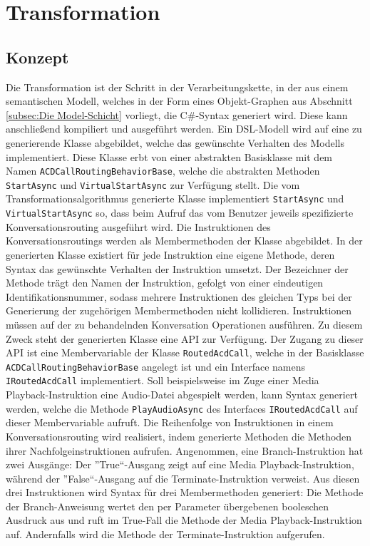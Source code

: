 \section{Transformation}
\label{sec:Transformation}

\subsection{Konzept}
\label{subsec:Konzept}
Die Transformation ist der Schritt in der Verarbeitungskette, in der aus einem semantischen Modell, welches in der Form eines Objekt-Graphen aus Abschnitt \ref{subsec:Die Model-Schicht} vorliegt, die C\#-Syntax generiert wird. Diese kann anschließend kompiliert und ausgeführt werden. Ein DSL-Modell wird auf eine zu generierende Klasse abgebildet, welche das gewünschte Verhalten des Modells implementiert. Diese Klasse erbt von einer abstrakten Basisklasse mit dem Namen \texttt{ACDCallRoutingBehaviorBase}, welche die abstrakten Methoden \texttt{StartAsync} und \texttt{VirtualStartAsync} zur Verfügung stellt. Die vom Transformationsalgorithmus generierte Klasse implementiert \texttt{Start\-Async} und \texttt{VirtualStartAsync} so, dass beim Aufruf das vom Benutzer jeweils spezifizierte Konversationsrouting ausgeführt wird.
\newline 
Die Instruktionen des Konversationsroutings werden als Membermethoden der Klasse abgebildet. In der generierten Klasse existiert für jede Instruktion eine eigene Methode, deren Syntax das gewünschte Verhalten der Instruktion umsetzt. Der Bezeichner der Methode trägt den Namen der Instruktion, gefolgt von einer eindeutigen Identifikationsnummer, sodass mehrere Instruktionen des gleichen Typs bei der Generierung der zugehörigen Membermethoden nicht kollidieren.
\newline 
Instruktionen müssen auf der zu behandelnden Konversation Operationen ausführen. Zu diesem Zweck steht der generierten Klasse eine API zur Verfügung. Der Zugang zu  dieser API ist eine Membervariable der Klasse \texttt{RoutedAcdCall}, welche in der Basisklasse \texttt{ACDCallRoutingBehaviorBase} angelegt ist und ein Interface namens \texttt{IRoutedAcdCall} implementiert. Soll beispielsweise im Zuge einer Media Playback-Instruktion eine Audio-Datei abgespielt werden, kann Syntax generiert werden, welche die Methode \texttt{PlayAudioAsync} des Interfaces \texttt{IRoutedAcdCall} auf dieser Membervariable aufruft. 
\newline
Die Reihenfolge von Instruktionen in einem Konversationsrouting wird realisiert, indem generierte Methoden die Methoden ihrer Nachfolgeinstruktionen aufrufen. Angenommen, eine Branch-Instruktion hat zwei Ausgänge: Der ''True``-Ausgang zeigt auf eine Media Playback-Instruktion, während der ''False``-Ausgang auf die Terminate-Instruktion verweist. Aus diesen drei Instruktionen wird Syntax für drei Membermethoden generiert: Die Methode der Branch-Anweisung wertet den per Parameter übergebenen booleschen Ausdruck aus und ruft im True-Fall die Methode der Media Playback-Instruktion auf. Andernfalls wird die Methode der Terminate-Instruktion aufgerufen. 
